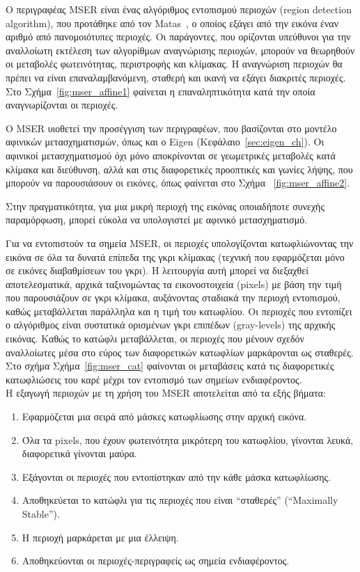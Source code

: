  Ο περιγραφέας MSER είναι ένας αλγόριθμος εντοπισμού περιοχών (region detection algorithm), που προτάθηκε από τον Matas~\cite{matas2004robust}, ο οποίος εξάγει από την εικόνα έναν αριθμό από πανομοιότυπες περιοχές.
Οι παράγοντες, που ορίζονται υπεύθυνοι για την αναλλοίωτη εκτέλεση των αλγορίθμων αναγνώρισης περιοχών, μπορούν να θεωρηθούν οι μεταβολές φωτεινότητας, 
περιστροφής και κλίμακας. Η αναγνώριση περιοχών θα πρέπει να είναι επαναλαμβανόμενη, σταθερή και ικανή να εξάγει διακριτές περιοχές. Στο Σχήμα~\ref{fig:mser_affine1} φαίνεται η επαναληπτικότητα
κατά την οποία αναγνωρίζονται οι περιοχές.\par
Ο MSER υιοθετεί την προσέγγιση των περιγραφέων, που βασίζονται στο μοντέλο αφινικών μετασχηματισμών, όπως και ο Εigen (Kεφάλαιο~\ref{sec:eigen_ch}).
Οι αφινικοί μετασχηματισμού όχι μόνο αποκρίνονται σε γεωμετρικές μεταβολές κατά κλίμακα και διεύθυνση,
αλλά και στις διαφορετικές προοπτικές και γωνίες λήψης, που μπορούν να παρουσιάσουν οι εικόνες, όπως φαίνεται στο Σχήμα ~\ref{fig:mser_affine2}.\par
Στην πραγματικότητα, για μια μικρή περιοχή της εικόνας οποιαδήποτε συνεχής παραμόρφωση, μπορεί εύκολα να υπολογιστεί με αφινικό μετασχηματισμό.\par
Για να εντοπιστούν τα σημεία MSER, οι περιοχές υπολογίζονται κατωφλιώνοντας την εικόνα σε όλα τα δυνατά επίπεδα της γκρι κλίμακας (τεχνική που εφαρμόζεται μόνο σε εικόνες διαβαθμίσεων του γκρι).
Η λειτουργία αυτή μπορεί να διεξαχθεί αποτελεσματικά, αρχικά ταξινομώντας τα εικονοστοιχεία (pixels) με βάση την τιμή που παρουσιάζουν σε γκρι κλίμακα, 
αυξάνοντας σταδιακά την περιοχή εντοπισμού, καθώς μεταβάλλεται παράλληλα και η τιμή του κατωφλίου.
Οι περιοχές που εντοπίζει ο αλγόριθμος είναι συστατικά ορισμένων γκρι επιπέδων (gray-levels) 
 της αρχικής εικόνας. Καθώς το κατώφλι μεταβάλλεται, οι περιοχές που μένουν σχεδόν αναλλοίωτες μέσα στο εύρος των διαφορετικών κατωφλίων
 μαρκάρονται ως σταθερές. Στο σχήμα Σχήμα~\ref{fig:mser_cat} φαίνονται οι μεταβάσεις κατά τις διαφορετικές κατωφλιώσεις του καρέ μέχρι τον εντοπισμό των σημείων ενδιαφέροντος.\\
  
Η εξαγωγή περιοχών με τη χρήση του MSER αποτελείται από τα εξής βήματα: 
  
  \begin{enumerate}
   
  \item Εφαρμόζεται μια σειρά από μάσκες κατωφλίωσης στην αρχική εικόνα.
  \item Όλα τα pixels, που έχουν φωτεινότητα μικρότερη του κατωφλίου, γίνονται λευκά, διαφορετικά γίνονται μαύρα.
  \item Εξάγονται οι περιοχές που εντοπίστηκαν από την κάθε μάσκα κατωφλίωσης.
  \item Αποθηκεύεται το κατώφλι για τις περιοχές που είναι ``σταθερές'' (``Μaximally Stable''). 
  \item Η περιοχή μαρκάρεται με μια έλλειψη.
  \item Αποθηκεύονται οι περιοχές-περιγραφείς ως σημεία ενδιαφέροντος.

 \end{enumerate}
 
